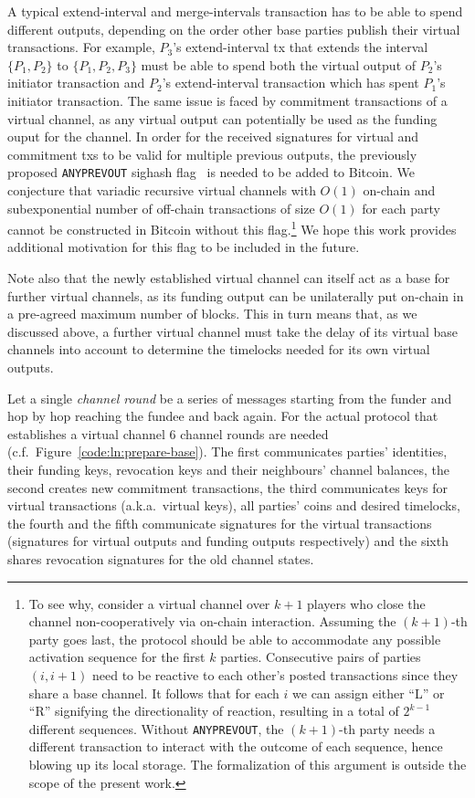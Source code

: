  A typical extend-interval and merge-intervals transaction has to be able to
  spend different outputs, depending on the order other base parties publish
  their virtual transactions. For example, $P_3$'s extend-interval tx that
  extends the interval $\{P_1, P_2\}$ to $\{P_1, P_2, P_3\}$ must be able to
  spend both the virtual output of $P_2$'s initiator transaction and $P_2$'s
  extend-interval transaction which has spent $P_1$'s initiator transaction. The
  same issue is faced by commitment transactions of a virtual channel, as any
  virtual output can potentially be used as the funding ouput for the channel.
  In order for the received signatures for virtual and commitment txs to be
  valid for multiple previous outputs, the previously proposed
  \texttt{ANYPREVOUT} sighash flag~\cite{anyprevout} is needed to be added to
  Bitcoin. We conjecture that variadic recursive virtual channels with $O(1)$
  on-chain and subexponential number of off-chain transactions of size $O(1)$
  for each party cannot be constructed in Bitcoin without this flag.\footnote{To
  see why, consider a virtual channel over $k+1$ players who close the channel
  non-cooperatively via on-chain interaction. Assuming the $(k+1)$-th party goes
  last, the protocol should be able to accommodate any possible activation
  sequence for the first $k$ parties. Consecutive pairs of parties $(i,i+1)$
  need to be reactive to each other's posted transactions since they share a
  base channel. It follows that for each $i$ we can assign either ``L'' or ``R''
  signifying the directionality of reaction, resulting in a total of $2^{k-1}$
  different sequences. Without \texttt{ANYPREVOUT}, the $(k+1)$-th party needs
  a different transaction to interact with the outcome of each sequence, hence
  blowing up its local storage. The formalization of this argument is outside
  the scope of the present work.} We hope this work provides additional
  motivation for this flag to be included in the future.

  Note also that the newly established virtual channel can itself act as a base
  for further virtual channels, as its funding output can be unilaterally put
  on-chain in a pre-agreed maximum number of blocks. This in turn means that, as
  we discussed above, a further virtual channel must take the delay of its
  virtual base channels into account to determine the timelocks needed for its
  own virtual outputs.

  Let a single \emph{channel round} be a series of messages starting from the
  funder and hop by hop reaching the fundee and back again. For the actual
  protocol that establishes a virtual channel $6$ channel rounds are needed
  (c.f.\ Figure~\ref{code:ln:prepare-base}). The first communicates
  parties' identities, their funding keys, revocation keys and their neighbours'
  channel balances, the second creates new commitment transactions, the third
  communicates keys for virtual transactions (a.k.a.\ virtual keys), all parties'
  coins and desired timelocks, the fourth and the
  fifth communicate signatures for the virtual transactions (signatures for
  virtual outputs and funding outputs respectively) and the sixth shares
  revocation signatures for the old channel states.

